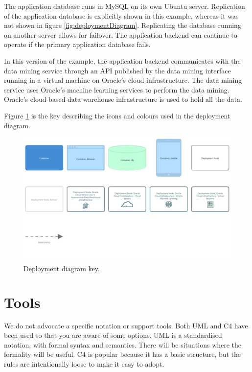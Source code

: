 The application database runs in MySQL on its own Ubuntu server.
Replication of the application database is explicitly shown in this example, whereas it was not shown in figure \ref{fig:deploymentDiagram}.
Replicating the database running on another server allows for failover.
The application backend can continue to operate if the primary application database fails.

In this version of the example, the application backend communicates with the data mining service
through an API published by the data mining interface running in a virtual machine on Oracle's cloud infrastructure.
The data mining service uses Oracle's machine learning services to perform the data mining.
Oracle's cloud-based data warehouse infrastructure is used to hold all the data.

\noindent
Figure \ref{fig:c4_deployment_key} is the key describing the icons and colours used in the deployment diagram.

\begin{figure}[h!]
    \centering
    \begin{adjustwidth}{-7.5mm}{-7.5mm}
        \includegraphics[trim=22 210 22 24,clip,width=0.95\paperwidth]{images/c4/deployment_diagram-key.png}
    \end{adjustwidth}
    \caption{Deployment diagram key.}
    \label{fig:c4_deployment_key}
\end{figure}

\section{Tools}
We do not advocate a specific notation or support tools.
Both UML and C4 have been used so that you are aware of some options.
UML is a standardised notation, with formal syntax and semantics.
There will be situations where the formality will be useful.
C4 is popular because it has a basic structure, but the rules are intentionally loose to make it easy to adopt.

